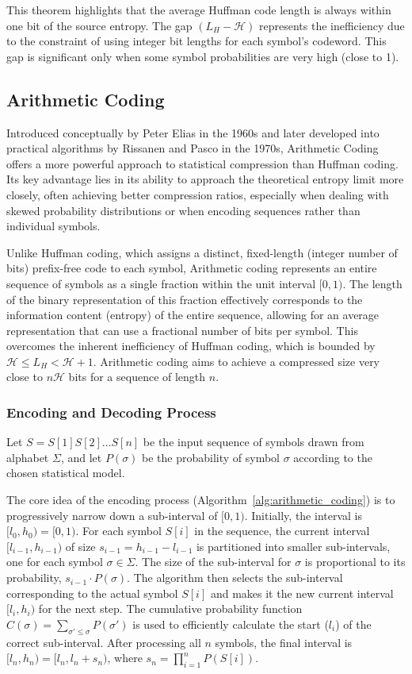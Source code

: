 This theorem highlights that the average Huffman code length is always within one bit of the source entropy. The gap $(L_H - \mathcal{H})$ represents the inefficiency due to the constraint of using integer bit lengths for each symbol's codeword. This gap is significant only when some symbol probabilities are very high (close to 1).

\subsection{Arithmetic Coding}

Introduced conceptually by Peter Elias in the 1960s and later developed into practical algorithms by Rissanen \cite{rissanen1976generalized} and Pasco \cite{pasco1976source} in the 1970s, Arithmetic Coding offers a more powerful approach to statistical compression than Huffman coding. Its key advantage lies in its ability to approach the theoretical entropy limit more closely, often achieving better compression ratios, especially when dealing with skewed probability distributions or when encoding sequences rather than individual symbols.

Unlike Huffman coding, which assigns a distinct, fixed-length (integer number of bits) prefix-free code to each symbol, Arithmetic coding represents an entire sequence of symbols as a single fraction within the unit interval $[0, 1)$. The length of the binary representation of this fraction effectively corresponds to the information content (entropy) of the entire sequence, allowing for an average representation that can use a fractional number of bits per symbol. This overcomes the inherent inefficiency of Huffman coding, which is bounded by $\mathcal{H} \le L_H < \mathcal{H} + 1$. Arithmetic coding aims to achieve a compressed size very close to $n\mathcal{H}$ bits for a sequence of length $n$.

\subsubsection{Encoding and Decoding Process}
Let $S = S[1]S[2]\ldots S[n]$ be the input sequence of symbols drawn from alphabet $\Sigma$, and let $P(\sigma)$ be the probability of symbol $\sigma$ according to the chosen statistical model.

The core idea of the encoding process (Algorithm~\ref{alg:arithmetic_coding}) is to progressively narrow down a sub-interval of $[0, 1)$. Initially, the interval is $[l_0, h_0) = [0, 1)$. For each symbol $S[i]$ in the sequence, the current interval $[l_{i-1}, h_{i-1})$ of size $s_{i-1} = h_{i-1} - l_{i-1}$ is partitioned into smaller sub-intervals, one for each symbol $\sigma \in \Sigma$. The size of the sub-interval for $\sigma$ is proportional to its probability, $s_{i-1} \cdot P(\sigma)$. The algorithm then selects the sub-interval corresponding to the actual symbol $S[i]$ and makes it the new current interval $[l_i, h_i)$ for the next step. The cumulative probability function $C(\sigma) = \sum_{\sigma' \le \sigma} P(\sigma')$ is used to efficiently calculate the start ($l_i$) of the correct sub-interval. After processing all $n$ symbols, the final interval is $[l_n, h_n) = [l_n, l_n + s_n)$, where $s_n = \prod_{i=1}^n P(S[i])$.

